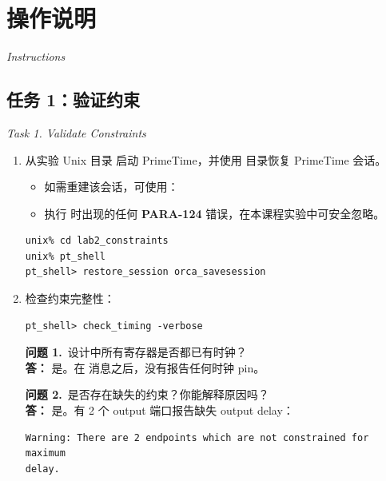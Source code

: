 \section{操作说明}
\label{lab2:instructions}

\noindent\textit{Instructions}

\subsection{任务 1：验证约束}
\label{lab2:task1}

\noindent\textit{Task 1. Validate Constraints}

\begin{enumerate}
  \item 从实验 Unix 目录  启动 PrimeTime，并使用  目录恢复 PrimeTime 会话。

\begin{noteBox}
\begin{itemize}
  \item 如需重建该会话，可使用：\\
  \item 执行  时出现的任何 \textbf{PARA-124} 错误，在本课程实验中可安全忽略。
\end{itemize}
\end{noteBox}

\begin{lstlisting}
unix% cd lab2_constraints
unix% pt_shell
pt_shell> restore_session orca_savesession
\end{lstlisting}

  \item 检查约束完整性：
\begin{lstlisting}
pt_shell> check_timing -verbose
\end{lstlisting}

\begin{questionBox}
\textbf{问题 1.}\ 设计中所有寄存器是否都已有时钟？\\[0.35em]
\textbf{答：} 是。在  消息之后，没有报告任何时钟 pin。

\textbf{问题 2.}\ 是否存在缺失的约束？你能解释原因吗？\\[0.35em]
\textbf{答：} 是。有 2 个 output 端口报告缺失 output delay：
\begin{lstlisting}
Warning: There are 2 endpoints which are not constrained for maximum
delay.


\end{lstlisting}
\end{questionBox}
\end{enumerate}
